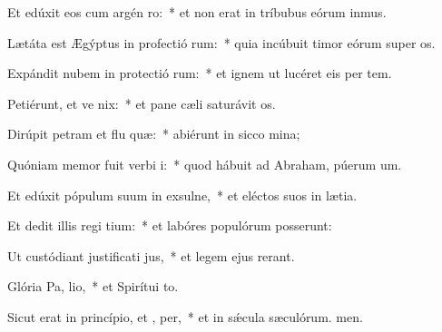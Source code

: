 \item Et edúxit eos cum argén  ro:~* et non erat in tríbubus eórum inmus.
\item Lætáta est Ægýptus in profectió rum:~* quia incúbuit timor eórum super os.
\item Expándit nubem in protectió rum:~* et ignem ut lucéret eis per tem.
\item Petiérunt, et ve nix:~* et pane cæli saturávit os.
\item Dirúpit petram et flu quæ:~* abiérunt in sicco mina;
\item Quóniam memor fuit verbi  i:~* quod hábuit ad Abraham, púerum um.
\item Et edúxit pópulum suum in exsulne,~* et eléctos suos in lætia.
\item Et dedit illis regi tium:~* et labóres populórum posserunt:
\item Ut custódiant justificati jus,~* et legem ejus rerant.
\item Glória Pa,  lio,~* et Spirítui to.
\item Sicut erat in princípio, et ,  per,~* et in sǽcula sæculórum. men.
